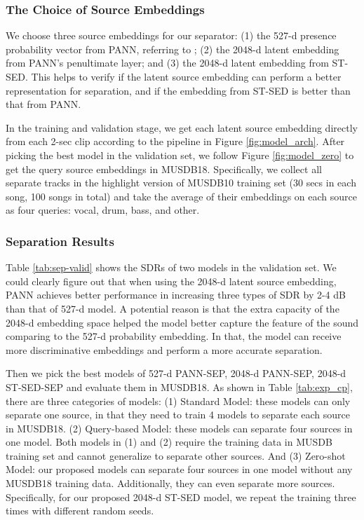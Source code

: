 \documentclass[letterpaper]{article} \usepackage{aaai22}  \usepackage{times}  \usepackage{helvet}  \usepackage{courier}  \usepackage[hyphens]{url}  \usepackage{graphicx} \urlstyle{rm} \def\UrlFont{\rm}  \usepackage{natbib}  \usepackage{caption} \DeclareCaptionStyle{ruled}{labelfont=normalfont,labelsep=colon,strut=off} \frenchspacing  \setlength{\pdfpagewidth}{8.5in}  \setlength{\pdfpageheight}{11in}  \usepackage{algorithm}
\begin{document}
\subsubsection{The Choice of Source Embeddings}
We choose three source embeddings for our separator: (1) the 527-d presence probability vector from PANN, referring to \cite{qiangss}; (2) the 2048-d latent embedding from PANN's penultimate layer; and (3) the 2048-d latent embedding from ST-SED. This helps to verify if the latent source embedding can perform a better representation for separation, and if the embedding from ST-SED is better than that from PANN.

In the training and validation stage, we get each latent source embedding directly from each 2-sec clip according to the pipeline in Figure \ref{fig:model_arch}. After picking the best model in the validation set, we follow Figure \ref{fig:model_zero} to get the query source embeddings in MUSDB18. Specifically, we collect all separate tracks in the highlight version of MUSDB10 training set (30 secs in each song, 100 songs in total) and take the average of their embeddings on each source as four queries: vocal, drum, bass, and other.

\subsubsection{Separation Results}

Table \ref{tab:sep-valid} shows the SDRs of two models in the validation set. We could clearly figure out that when using the 2048-d latent source embedding, PANN achieves better performance in increasing three types of SDR by 2-4 dB than that of 527-d model. A potential reason is that the extra capacity of the 2048-d embedding space helped the model better capture the feature of the sound comparing to the 527-d probability embedding. In that, the model can receive more discriminative embeddings and perform a more accurate separation. 

Then we pick the best models of 527-d PANN-SEP, 2048-d PANN-SEP, 2048-d ST-SED-SEP and evaluate them in MUSDB18. As shown in Table \ref{tab:exp_cp}, there are three categories of models: (1) Standard Model: these models can only separate one source, in that they need to train 4 models to separate each source in MUSDB18. (2) Query-based Model: these models can separate four sources in one model. Both models in (1) and (2) require the training data in MUSDB training set and cannot generalize to separate other sources. And (3) Zero-shot Model: our proposed models can separate four sources in one model without any MUSDB18 training data. Additionally, they can even separate more sources. Specifically, for our proposed 2048-d ST-SED model, we repeat the training three times with different random seeds.
\end{document}
